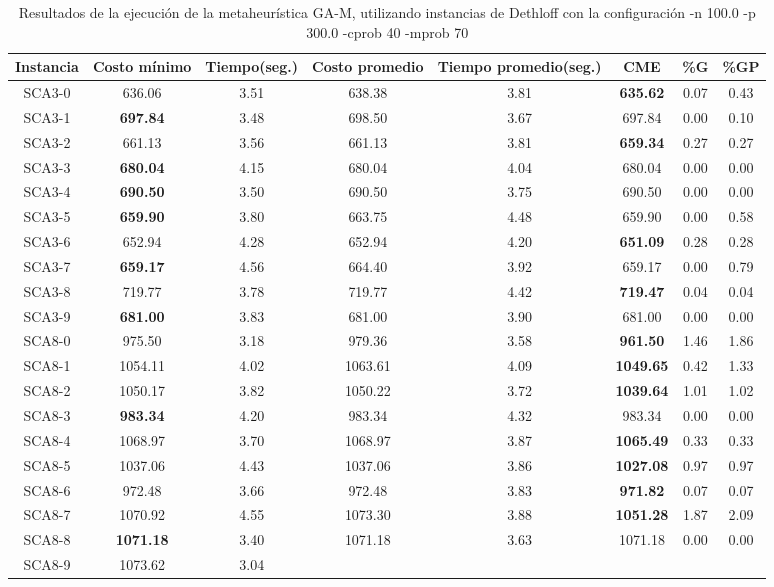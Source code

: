 \begin{table}[ht]
\caption{Resultados de la ejecución de la metaheurística GA-M, utilizando instancias de Dethloff con la configuración -n 100.0 -p 300.0 -cprob 40 -mprob 70}
\centering
\small
\begin{tabular}{c c c c c c c c}
\hline\hline
Instancia & Costo mínimo & Tiempo(seg.) & Costo promedio & Tiempo promedio(seg.) & CME & \%G & \%GP \\ [0.5ex]
\hline
SCA3-0 & 636.06 & 3.51 & 
638.38 & 3.81 & \bf{635.62} & 
0.07 & 0.43\\SCA3-1 & \bf{697.84} & 3.48 & 
698.50 & 3.67 & 697.84 & 0.00
 & 0.10\\SCA3-2 & 661.13 & 3.56 & 
661.13 & 3.81 & \bf{659.34} & 
0.27 & 0.27\\SCA3-3 & \bf{680.04} & 4.15 & 
680.04 & 4.04 & 680.04 & 0.00
 & 0.00\\
SCA3-4 & \bf{690.50} & 3.50 & 
690.50 & 3.75 & 690.50 & 0.00
 & 0.00\\
SCA3-5 & \bf{659.90} & 3.80 & 
663.75 & 4.48 & 659.90 & 0.00
 & 0.58\\SCA3-6 & 652.94 & 4.28 & 
652.94 & 4.20 & \bf{651.09} & 
0.28 & 0.28\\SCA3-7 & \bf{659.17} & 4.56 & 
664.40 & 3.92 & 659.17 & 0.00
 & 0.79\\SCA3-8 & 719.77 & 3.78 & 
719.77 & 4.42 & \bf{719.47} & 
0.04 & 0.04\\SCA3-9 & \bf{681.00} & 3.83 & 
681.00 & 3.90 & 681.00 & 0.00
 & 0.00\\
SCA8-0 & 975.50 & 3.18 & 
979.36 & 3.58 & \bf{961.50} & 
1.46 & 1.86\\SCA8-1 & 1054.11 & 4.02 & 
1063.61 & 4.09 & \bf{1049.65} & 
0.42 & 1.33\\SCA8-2 & 1050.17 & 3.82 & 
1050.22 & 3.72 & \bf{1039.64} & 
1.01 & 1.02\\SCA8-3 & \bf{983.34} & 4.20 & 
983.34 & 4.32 & 983.34 & 0.00
 & 0.00\\
SCA8-4 & 1068.97 & 3.70 & 
1068.97 & 3.87 & \bf{1065.49} & 
0.33 & 0.33\\SCA8-5 & 1037.06 & 4.43 & 
1037.06 & 3.86 & \bf{1027.08} & 
0.97 & 0.97\\SCA8-6 & 972.48 & 3.66 & 
972.48 & 3.83 & \bf{971.82} & 
0.07 & 0.07\\SCA8-7 & 1070.92 & 4.55 & 
1073.30 & 3.88 & \bf{1051.28} & 
1.87 & 2.09\\SCA8-8 & \bf{1071.18} & 3.40 & 
1071.18 & 3.63 & 1071.18 & 0.00
 & 0.00\\
SCA8-9 & 1073.62 & 3.04 & 

\end{tabular}
\end{table}
